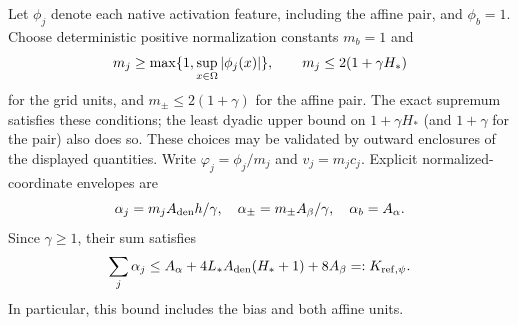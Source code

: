 Let $\phi_j$ denote each native activation feature, including the affine
pair, and $\phi_b=1$. Choose deterministic positive normalization constants
$m_b=1$ and
\begin{equation}
 m_j\ge\max\{1,\sup_{x\in\Omega}|\phi_j(x)|\},\qquad
 m_j\le2(1+\gamma H_*)
 \label{eq:psi-column-normalization}
\end{equation}
for the grid units, and $m_\pm\le2(1+\gamma)$ for the affine pair.
The exact supremum satisfies these conditions; the least dyadic upper bound on
$1+\gamma H_*$ (and $1+\gamma$ for the pair) also does so. These choices
may be validated by outward enclosures of the displayed quantities. Write $\varphi_j=\phi_j/m_j$ and $v_j=m_jc_j$.
Explicit normalized-coordinate envelopes are
\begin{equation}
 \alpha_j=m_jA_{\rm den}h/\gamma,\quad
 \alpha_\pm=m_\pm A_\beta/\gamma,\quad
 \alpha_b=A_\alpha.
 \label{eq:psi-coordinate-envelopes}
\end{equation}
Since $\gamma\ge1$, their sum satisfies
\begin{equation}
 \sum_j\alpha_j\le
 A_\alpha+4L_*A_{\rm den}(H_*+1)+8A_\beta=:K_{{\rm ref},\psi}.
 \label{eq:psi-normalized-l1}
\end{equation}
In particular, this bound includes the bias and both affine units.

